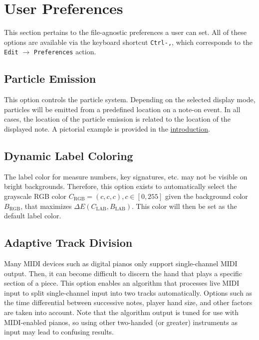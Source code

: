 \documentclass[english]{article}
\providecommand{\mi}[1]{\texttt{#1}}
\begin{document}
\newpage

\section{User Preferences}

This section pertains to the file-agnostic preferences a user can set.
All of these options are available via the keyboard shortcut \mi{Ctrl-,},
which corresponds to the \mi{Edit} $\rightarrow$ \mi{Preferences} action.

\subsection{Particle Emission}

This option controls the particle system. Depending on the selected display mode, particles will be emitted from a 
predefined location on a note-on event. In all cases, the location of the particle emission is related to the location of the
displayed note. A pictorial example is provided in the 
\textcolor{lcol}{\hyperref[sec:intro]{introduction}}.

\subsection{Dynamic Label Coloring}

The label color for measure numbers, key signatures, etc. may not be visible on bright backgrounds. Therefore,
this option exists to automatically select the grayscale RGB color $C_\text{RGB}=(c,c,c), c \in [0, 255]$
given the background color $B_\text{RGB}$,
that maximizes $\Delta E(C_\text{LAB}, B_\text{LAB})$.
This color will then be set as the default label color.

\subsection{Adaptive Track Division}

Many MIDI devices such as digital pianos only support single-channel MIDI output. Then, it can become difficult to discern the
hand that plays a specific section of a piece. This option enables an algorithm that processes live MIDI input to split
single-channel input into two tracks automatically. Options such as the time differential between successive notes, 
player hand size, and other factors are taken into account. Note that the algorithm output is tuned for use with MIDI-enabled
pianos, so using other two-handed (or greater) instruments as input may lead to confusing results.
\end{document}
